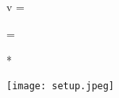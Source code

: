 \documentclass["OSF-Lab.tex"]{subfiles}
\begin{document}
\graphicspath{{\subfix{./.build/figures/OSF-Lab.2}}}

\begin{minipage}{10em}
  \begin{BM}
    v = 
  \end{BM}
  
\end{minipage}
\begin{minipage}{20em}
  \begin{BM}
    = 
  \end{BM}
\end{minipage}

\begin{sectionBox}*{} %
  \begin{center}
    \texttt{[image: setup.jpeg]}
  \end{center}
\end{sectionBox}
\end{document}
